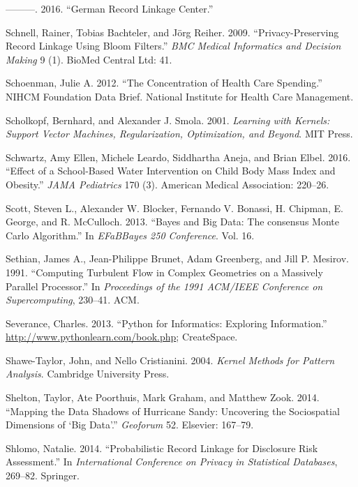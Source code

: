 \documentclass[]{krantz}
\begin{document}
\hypertarget{ref-Schnell2016}{}
---------. 2016. ``German Record Linkage Center.''

\hypertarget{ref-schnell2009privacy}{}
Schnell, Rainer, Tobias Bachteler, and Jörg Reiher. 2009.
``Privacy-Preserving Record Linkage Using Bloom Filters.'' \emph{BMC
Medical Informatics and Decision Making} 9 (1). BioMed Central Ltd: 41.

\hypertarget{ref-healthcarespending}{}
Schoenman, Julie A. 2012. ``The Concentration of Health Care Spending.''
NIHCM Foundation Data Brief. National Institute for Health Care
Management.

\hypertarget{ref-Scholkopf2001}{}
Scholkopf, Bernhard, and Alexander J. Smola. 2001. \emph{Learning with
Kernels: Support Vector Machines, Regularization, Optimization, and
Beyond}. MIT Press.

\hypertarget{ref-schwartz2016effect}{}
Schwartz, Amy Ellen, Michele Leardo, Siddhartha Aneja, and Brian Elbel.
2016. ``Effect of a School-Based Water Intervention on Child Body Mass
Index and Obesity.'' \emph{JAMA Pediatrics} 170 (3). American Medical
Association: 220--26.

\hypertarget{ref-scott2013bayes}{}
Scott, Steven L., Alexander W. Blocker, Fernando V. Bonassi, H. Chipman,
E. George, and R. McCulloch. 2013. ``Bayes and Big Data: The consensus
Monte Carlo Algorithm.'' In \emph{EFaBBayes 250 Conference}. Vol. 16.

\hypertarget{ref-bigdata_old1}{}
Sethian, James A., Jean-Philippe Brunet, Adam Greenberg, and Jill P.
Mesirov. 1991. ``Computing Turbulent Flow in Complex Geometries on a
Massively Parallel Processor.'' In \emph{Proceedings of the 1991
ACM/IEEE Conference on Supercomputing}, 230--41. ACM.

\hypertarget{ref-SeverancePython}{}
Severance, Charles. 2013. ``Python for Informatics: Exploring
Information.'' \url{http://www.pythonlearn.com/book.php}; CreateSpace.

\hypertarget{ref-ShaweTaylor2004}{}
Shawe-Taylor, John, and Nello Cristianini. 2004. \emph{Kernel Methods
for Pattern Analysis}. Cambridge University Press.

\hypertarget{ref-shelton2014mapping}{}
Shelton, Taylor, Ate Poorthuis, Mark Graham, and Matthew Zook. 2014.
``Mapping the Data Shadows of Hurricane Sandy: Uncovering the
Sociospatial Dimensions of `Big Data'.'' \emph{Geoforum} 52. Elsevier:
167--79.

\hypertarget{ref-shlomo2014probabilistic}{}
Shlomo, Natalie. 2014. ``Probabilistic Record Linkage for Disclosure
Risk Assessment.'' In \emph{International Conference on Privacy in
Statistical Databases}, 269--82. Springer.
\end{document}
